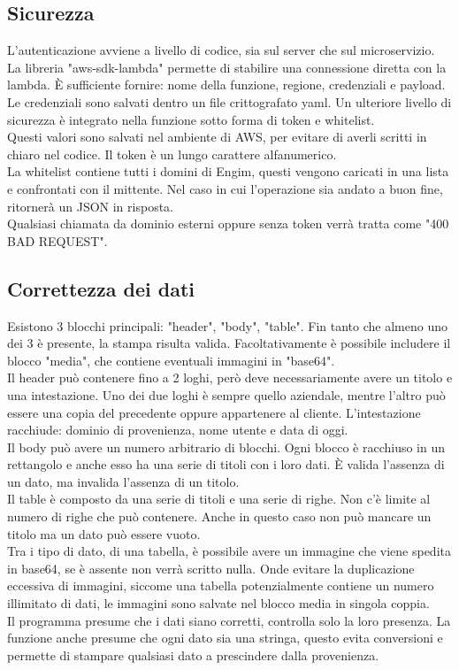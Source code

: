 \documentclass[12pt]{article}
\begin{document}
\subsection{Sicurezza}
L'autenticazione avviene a livello di codice, sia sul server che sul microservizio.
\\ La libreria "aws-sdk-lambda" permette di stabilire una connessione diretta con la 
lambda. È sufficiente fornire: nome della funzione, regione, credenziali e payload. 
Le credenziali sono salvati dentro un file crittografato yaml. 
Un ulteriore livello di sicurezza è integrato nella funzione sotto forma 
di token e whitelist. 
\\ Questi valori sono salvati nel ambiente di AWS, per evitare di averli 
scritti in chiaro nel codice. Il token è un lungo carattere alfanumerico.
\\ La whitelist contiene tutti i domini di Engim, questi vengono caricati in 
una lista e confrontati con il mittente. 
Nel caso in cui 
l'operazione sia andato a buon fine, ritornerà un JSON in risposta.
\\ Qualsiasi chiamata da dominio esterni oppure senza token verrà tratta come 
"400 BAD REQUEST". 

\subsection{Correttezza dei dati}
Esistono 3 blocchi principali: "header", "body", "table".
Fin tanto che almeno uno dei 3 è presente, la stampa risulta valida.
Facoltativamente è possibile includere il blocco "media", che contiene 
eventuali immagini in "base64". 
\\ Il header può contenere fino a 2 loghi, però deve necessariamente avere 
un titolo e una intestazione. 
Uno dei due loghi è sempre quello aziendale, mentre l'altro può essere una copia 
del precedente oppure appartenere al cliente.
L'intestazione racchiude: dominio di provenienza, nome utente e data di oggi.
\\ Il body può avere un numero arbitrario di blocchi. Ogni blocco è racchiuso 
in un rettangolo e anche esso ha una serie di titoli con i loro dati. 
È valida l'assenza di un dato, ma invalida l'assenza di un titolo. 
\\ Il table è composto da una serie di titoli e una serie di righe. Non c'è limite 
al numero di righe che può contenere.
Anche in questo caso non può mancare un titolo ma un dato può essere vuoto. 
\\ Tra i tipo di dato, di una tabella, 
è possibile avere un immagine che viene spedita in 
base64, se è assente non verrà scritto nulla. Onde evitare la duplicazione 
eccessiva di immagini, siccome una tabella potenzialmente contiene un numero 
illimitato di dati, le immagini sono salvate nel blocco media in singola coppia. 
\\ Il programma presume che i dati siano corretti, controlla solo la loro presenza.
La funzione anche presume che ogni dato sia una stringa, questo evita conversioni 
e permette di stampare qualsiasi dato a prescindere dalla provenienza.
\end{document}
